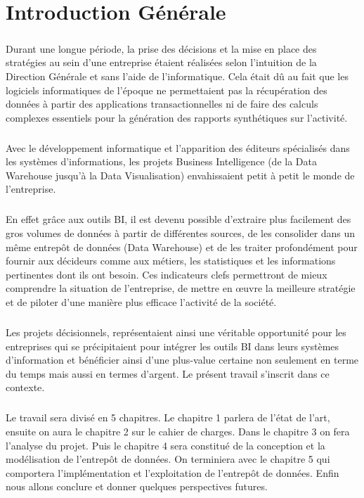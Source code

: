 \chapter*{Introduction Générale}%
%
\paragraph{}
Durant une longue période, la prise des décisions et la mise en place des stratégies au sein d’une entreprise étaient réalisées selon l’intuition de la Direction Générale et sans l’aide de l’informatique. Cela était dû au fait que les logiciels informatiques de l’époque ne permettaient pas la récupération des données à partir des applications transactionnelles ni de faire des calculs complexes essentiels pour la génération des rapports synthétiques sur l’activité.
\paragraph{}
Avec le développement informatique et l’apparition des éditeurs spécialisés dans les systèmes d’informations, les projets Business Intelligence (de la Data Warehouse jusqu’à la Data Visualisation) envahissaient petit à petit le monde de l’entreprise.
\paragraph{}
En effet grâce aux outils BI, il est devenu possible d’extraire plus facilement des gros volumes de données à partir de différentes sources, de les consolider dans un même entrepôt de données (Data Warehouse) et de les traiter profondément pour fournir aux décideurs comme aux métiers, les statistiques et les informations pertinentes dont ils ont besoin. Ces indicateurs clefs permettront de mieux comprendre la situation de l’entreprise, de mettre en œuvre la meilleure stratégie et de piloter d’une manière plus efficace l’activité de la société.
\paragraph{}
Les projets décisionnels, représentaient ainsi une véritable opportunité pour les entreprises qui se précipitaient pour intégrer les outils BI dans leurs systèmes d’information et bénéficier ainsi d’une plus-value certaine non seulement en terme du temps mais aussi en termes d’argent. Le présent travail s’inscrit dans ce contexte. 
\paragraph{}
Le travail sera divisé en 5 chapitres. Le chapitre 1 parlera de l’état de l’art, ensuite on aura le chapitre 2 sur le cahier de charges. Dans le chapitre 3 on fera l'analyse du projet. Puis le chapitre 4 sera constitué de la conception et la modélisation de l'entrepôt de données. On terminiera avec le chapitre 5 qui comportera l'implémentation et l'exploitation de l'entrepôt de données. Enfin nous allons conclure et donner quelques perspectives futures.
